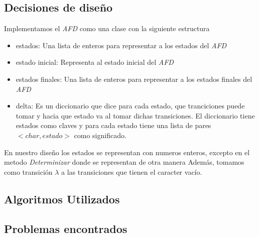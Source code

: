 \subsection{Decisiones de diseño}
Implementamos el \emph{AFD} como una clase con la siguiente estructura

\begin{itemize}
	\item estados: Una lista de enteros para representar a los estados del \emph{AFD}
	\item estado inicial: Representa al estado inicial del \emph{AFD}
	\item estados finales: Una lista de enteros para representar a los estados finales del \emph{AFD}
	\item delta: Es un diccionario que dice para cada estado, que tranciciones puede tomar y hacia que estado va al tomar dichas transiciones. El diccionario tiene estados como claves y para cada estado tiene una lista de pares $<char, estado>$ como significado.
\end{itemize}

En nuestro diseño los estados se representan con numeros enteros, excepto en el metodo \emph{Determinizar} donde se representan de otra manera %
Además, tomamos como transición $\lambda$ a las transiciones que tienen el caracter vacío.
\subsection{Algoritmos Utilizados}

\subsection{Problemas encontrados}
